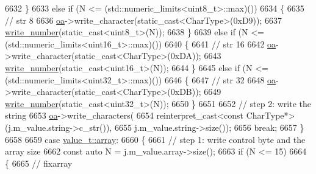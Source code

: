 \begin{DoxyCode}
6632                 \}
6633                 \textcolor{keywordflow}{else} \textcolor{keywordflow}{if} (N <= (std::numeric\_limits<uint8\_t>::max)())
6634                 \{
6635                     \textcolor{comment}{// str 8}
6636                     \hyperlink{classnlohmann_1_1detail_1_1binary__writer_a6f15b782a7900f50ef37d123008e601b}{oa}->write\_character(static\_cast<CharType>(0xD9));
6637                     \hyperlink{classnlohmann_1_1detail_1_1binary__writer_a62cfd50a511371e718f37ad7bb29ae9d}{write\_number}(static\_cast<uint8\_t>(N));
6638                 \}
6639                 \textcolor{keywordflow}{else} \textcolor{keywordflow}{if} (N <= (std::numeric\_limits<uint16\_t>::max)())
6640                 \{
6641                     \textcolor{comment}{// str 16}
6642                     \hyperlink{classnlohmann_1_1detail_1_1binary__writer_a6f15b782a7900f50ef37d123008e601b}{oa}->write\_character(static\_cast<CharType>(0xDA));
6643                     \hyperlink{classnlohmann_1_1detail_1_1binary__writer_a62cfd50a511371e718f37ad7bb29ae9d}{write\_number}(static\_cast<uint16\_t>(N));
6644                 \}
6645                 \textcolor{keywordflow}{else} \textcolor{keywordflow}{if} (N <= (std::numeric\_limits<uint32\_t>::max)())
6646                 \{
6647                     \textcolor{comment}{// str 32}
6648                     \hyperlink{classnlohmann_1_1detail_1_1binary__writer_a6f15b782a7900f50ef37d123008e601b}{oa}->write\_character(static\_cast<CharType>(0xDB));
6649                     \hyperlink{classnlohmann_1_1detail_1_1binary__writer_a62cfd50a511371e718f37ad7bb29ae9d}{write\_number}(static\_cast<uint32\_t>(N));
6650                 \}
6651 
6652                 \textcolor{comment}{// step 2: write the string}
6653                 \hyperlink{classnlohmann_1_1detail_1_1binary__writer_a6f15b782a7900f50ef37d123008e601b}{oa}->write\_characters(
6654                     reinterpret\_cast<const CharType*>(j.m\_value.string->c\_str()),
6655                     j.m\_value.string->size());
6656                 \textcolor{keywordflow}{break};
6657             \}
6658 
6659             \textcolor{keywordflow}{case} \hyperlink{namespacenlohmann_1_1detail_a1ed8fc6239da25abcaf681d30ace4985af1f713c9e000f5d3f280adbd124df4f5}{value\_t::array}:
6660             \{
6661                 \textcolor{comment}{// step 1: write control byte and the array size}
6662                 \textcolor{keyword}{const} \textcolor{keyword}{auto} N = j.m\_value.array->size();
6663                 \textcolor{keywordflow}{if} (N <= 15)
6664                 \{
6665                     \textcolor{comment}{// fixarray}

\end{DoxyCode}
